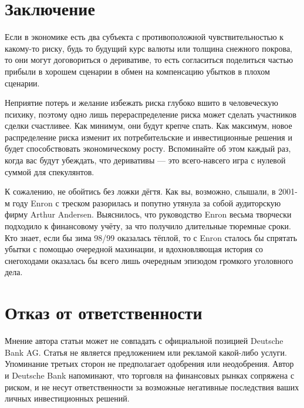 \section*{Заключение}

Если в экономике есть два субъекта с противоположной чувствительностью
к какому-то риску, будь то будущий курс валюты или толщина снежного покрова, то они
могут договориться о деривативе, то есть согласиться поделиться частью прибыли
в хорошем сценарии в обмен на компенсацию убытков в плохом сценарии.

Неприятие потерь и желание избежать риска глубоко вшито в человеческую
психику, поэтому одно лишь перераспределение риска может сделать участников сделки
счастливее. Как минимум, они будут крепче спать. Как максимум, новое распределение
риска изменит их потребительские и инвестиционные решения и будет способствовать
экономическому росту. Вспоминайте об этом каждый раз, когда вас будут убеждать, что
деривативы --- это всего-навсего игра с нулевой суммой для спекулянтов.

К сожалению, не обойтись без ложки дёгтя. Как вы, возможно, слышали, в 2001-м году
Enron с треском разорилась и попутно утянула за собой аудиторскую фирму Arthur
Andersen. Выяснилось, что руководство Enron весьма творчески подходило к
финансовому учёту, за что получило длительные тюремные сроки. Кто знает, если бы
зима 98/99 оказалась тёплой, то с Enron сталось бы спрятать убытки с помощью
очередной махинации, и вдохновляющая история со снегоходами оказалась бы
всего лишь очередным эпизодом громкого уголовного дела.

\section*{Отказ от ответственности}

Мнение автора статьи может не совпадать с официальной позицией Deutsche Bank AG.
Статья не является предложением или рекламой какой-либо услуги. Упоминание
третьих сторон не предполагает одобрения или неодобрения. Автор и Deutsche Bank
напоминают, что торговля на финансовых рынках сопряжена с риском, и не несут
ответственности за возможные негативные последствия ваших личных инвестиционных
решений.

\begin{otherlanguage}{english}
\printbibliography[title = \begin{otherlanguage}{russian}Список
литературы\end{otherlanguage}]
\end{otherlanguage}

\printendnotes


